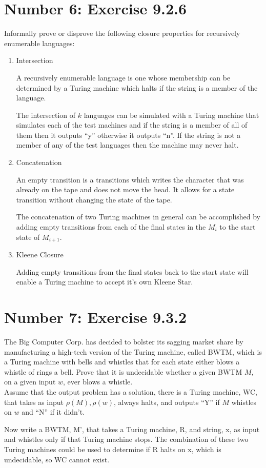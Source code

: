 \documentclass[12pt,a4paper,twoside]{article}  %
\begin{document}
\section{Number 6: Exercise 9.2.6}

Informally prove or disprove the following closure properties for
recursively enumerable languages:

\begin{enumerate}

\item Intersection

A recursively enumerable language is one whose membership can be
determined by a Turing machine which halts if the string is a member
of the language.

The intersection of $k$ languages can be simulated with a Turing
machine that simulates each of the test machines and if the string is
a member of all of them then it outputs ``y'' otherwise it outputs
``n''. If the string is not a member of any of the test languages then
the machine may never halt.

\item Concatenation

An empty transition is a transitions which writes the character that
was already on the tape and does not move the head. It allows for a
state transition without changing the state of the tape.

The concatenation of two Turing machines in general can be
accomplished by adding empty transitions from each of the final states
in the $M_i$ to the start state of $M_{i+1}$.

\item Kleene Closure

Adding empty transitions from the final states back to the start state
will enable a Turing machine to accept it's own Kleene Star.

\end{enumerate}

\section{Number 7: Exercise 9.3.2}

The Big Computer Corp. has decided to bolster its sagging market
share by manufacturing a high-tech version of the Turing machine,
called BWTM, which is a Turing machine with bells and whistles that for
each state either blows a whistle of rings a bell. Prove that it is
undecidable whether a given BWTM $M$, on a given input $w$, ever
blows a whistle.\\

Assume that the output problem has a solution, there is a Turing
machine, WC, that takes as input $\rho(M),\rho(w)$, always halts, and
outputs ``Y'' if $M$ whistles on $w$ and ``N'' if it didn't.

Now write a BWTM, M', that takes a Turing machine, R, and string, x,
as input and whistles only if that Turing machine stops. The
combination of these two Turing machines could be used to determine if
R halts on x, which is undecidable, so WC cannot exist.
\end{document}
